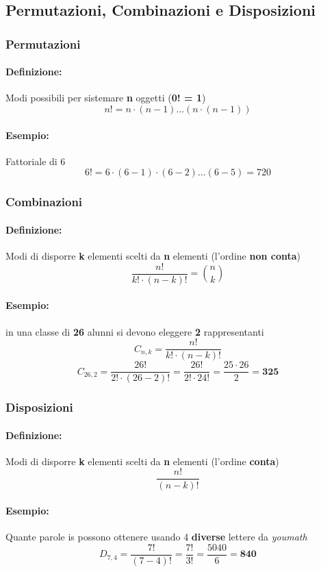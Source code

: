 \documentclass[]{article}
\newcommand{\definizione}{\paragraph{Definizione:}}
\begin{document}
    \subsection{Permutazioni, Combinazioni e Disposizioni}
    \subsubsection{Permutazioni}
    \definizione Modi possibili per sistemare \textbf{n} oggetti (\textbf{0! = 1})
    \[ n! = n \cdot (n-1) \ldots (n \cdot (n-1)) \]
    \paragraph{Esempio:} Fattoriale di 6
    \[ 6! = 6 \cdot (6-1) \cdot (6-2) \ldots (6-5) = 720 \]

    \subsubsection{Combinazioni}
    \definizione Modi di disporre \textbf{k} elementi scelti da \textbf{n} elementi (l'ordine \textbf{non conta})
    \[ \frac{n!}{k! \cdot (n-k)!} = \binom{n}{k} \]

    \paragraph{Esempio:} in una classe di \textbf{26} alunni si devono eleggere \textbf{2} rappresentanti
    \[ C_{n,k} = \frac{n!}{k! \cdot (n-k)!} \]
    \[ C_{26,2} = \frac{26!}{2! \cdot (26-2)!} = \frac{26!}{2! \cdot 24!} = \frac{25 \cdot 26}{2} = \textbf{325} \]
    \begin{center} 
    \end{center}

    \subsubsection{Disposizioni}
    \definizione Modi di disporre \textbf{k} elementi scelti da \textbf{n} elementi (l'ordine \textbf{conta})
    \[ \frac{n!}{(n-k)!}\]
    \paragraph{Esempio:} Quante parole is possono ottenere usando 4 \textbf{diverse} lettere da \textit{youmath} 
    \[ D_{7,4} = \frac{7!}{(7-4)!} = \frac{7!}{3!} = \frac{5040}{6} = \textbf{840} \]
\end{document}
